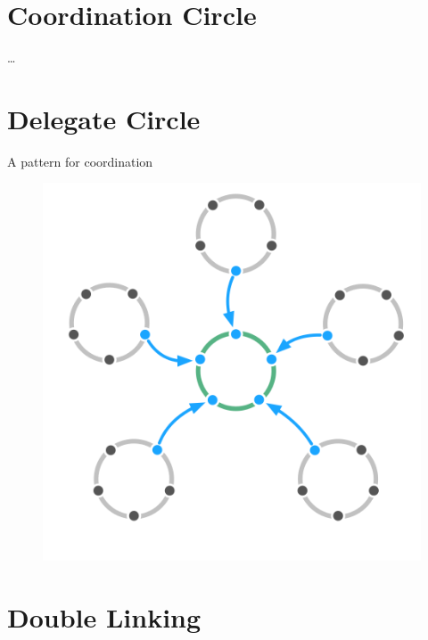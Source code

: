 \section{Coordination Circle}
\label{coordinationcircle}

{\ldots}

\section{Delegate Circle}
\label{delegatecircle}

A pattern for coordination

\begin{figure}[htbp]
\centering
\includegraphics[keepaspectratio,width=\textwidth,height=0.75\textheight]{img/structural-patterns/delegate-circle.png}
\end{figure}

\section{Double Linking}
\label{doublelinking}

